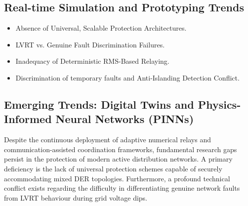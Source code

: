 \subsection{Real-time Simulation and Prototyping Trends}

\begin{itemize}
\item Absence of Universal, Scalable Protection Architectures.
\item LVRT vs. Genuine Fault Discrimination Failures.
\item Inadequacy of Deterministic RMS-Based Relaying.
\item Discrimination of temporary faults and Anti-Islanding Detection Conflict.
\end{itemize}

\subsection{Emerging Trends: Digital Twins and Physics-Informed Neural Networks (PINNs)}
Despite the continuous deployment of adaptive numerical relays and communication-assisted coordination frameworks, fundamental research gaps persist in the protection of modern active distribution networks. A primary deficiency is the lack of universal protection schemes capable of securely accommodating mixed DER topologies. Furthermore, a profound technical conflict exists regarding the difficulty in differentiating genuine network faults from LVRT behaviour during grid voltage dips.

